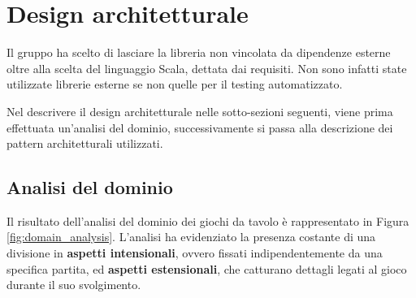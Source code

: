 \section{Design architetturale}




Il gruppo ha scelto di lasciare la libreria non vincolata da dipendenze esterne oltre alla scelta del linguaggio Scala, dettata dai requisiti.
%
Non sono infatti state utilizzate librerie esterne se non quelle per il testing automatizzato.

Nel descrivere il design architetturale nelle sotto-sezioni seguenti, viene prima effettuata un'analisi del dominio, successivamente si passa alla descrizione dei pattern architetturali utilizzati.


\subsection{Analisi del dominio}

Il risultato dell'analisi del dominio dei giochi da tavolo è rappresentato in Figura \ref{fig:domain_analysis}.
%
L'analisi ha evidenziato la presenza costante di una divisione in \textbf{aspetti intensionali}, ovvero fissati indipendentemente da una specifica partita, ed \textbf{aspetti estensionali}, che catturano dettagli legati al gioco durante il suo svolgimento.

